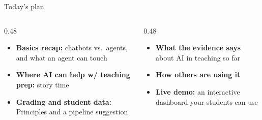 \documentclass[aspectratio=169, 10pt]{beamer}
\begin{document}
\begin{frame}{Today's plan}
\vskip2pt
\begin{columns}[T]
\begin{column}{0.48\textwidth}
\begin{tcolorbox}[keybox, title={\faLock\quad 1:00 --- Emily}]
\small
\begin{itemize}\setlength{\itemsep}{4pt}
  \item \textbf{Basics recap:} chatbots vs.\ agents, and what an agent can touch
  \item \textbf{Where AI can help w/ teaching prep:} story time
  \item \textbf{Grading and student data:} Principles and a pipeline suggestion
\end{itemize}
\end{tcolorbox}
\end{column}
\begin{column}{0.48\textwidth}
\begin{tcolorbox}[keybox, title={\faBook\quad 1:45 --- Erkmen}]
\small
\begin{itemize}\setlength{\itemsep}{4pt}
  \item \textbf{What the evidence says} about AI in teaching so far
  \item \textbf{How others are using it}
  \item \textbf{Live demo:} an interactive dashboard your students can use
\end{itemize}
\end{tcolorbox}
\end{column}
\end{columns}
\vskip6pt
\end{frame}

\end{document}
